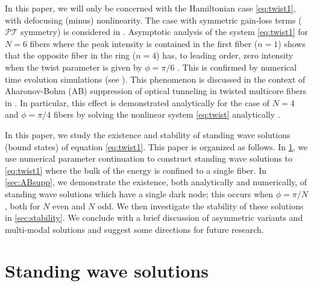 \documentclass[12pt,reqno]{amsart}
\begin{document}
In this paper, we will only be concerned with the Hamiltonian case \cref{eq:twist1}, with defocusing (minus) nonlinearity. The case with symmetric gain-loss terms ($\mathcal{PT}$ symmetry) is considered in \cite{castro2016}. Asymptotic analysis of the system \cref{eq:twist1} for $N=6$ fibers where the peak intensity is contained in the first fiber ($n=1$) shows that the opposite fiber in the ring ($n=4$) has, to leading order, zero intensity when the twist parameter is given by $\phi = \pi/6$ \cite{castro2016}. This is confirmed by numerical time evolution simulations (see \cite[Figures 4 and 5]{castro2016}). This phenomenon is discussed in the context of Aharonov-Bohm (AB) suppression of optical tunneling in twisted multicore fibers in \cite{Parto2017,Parto2019}. In particular, this effect is demonstrated analytically for the case of $N = 4$ and $\phi = \pi/4$ fibers by solving the nonlinear system \cref{eq:twist} analytically \cite{Parto2019}. 

In this paper, we study the existence and stability of standing wave solutions (bound states) of equation \cref{eq:twist1}. This paper is organized as follows. In \cref{sec:standingwave}, we use numerical parameter continuation to construct standing wave solutions to \cref{eq:twist1} where the bulk of the energy is confined to a single fiber. In \cref{sec:ABsupp}, we demonstrate the existence, both analytically and numerically, of standing wave solutions which have a single dark node; this occurs when $\phi = \pi/N$, both for $N$ even and $N$ odd. We then investigate the stability of these solutions in \cref{sec:stability}. We conclude with a brief discussion of asymmetric variants and multi-modal solutions and suggest some directions for future research.

\section{Standing wave solutions}\label{sec:standingwave}
\end{document}
